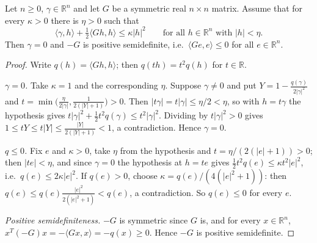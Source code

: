 \begin{lemma}
Let $n\ge0$, $\gamma\in\mathbb R^n$ and let $G$ be a symmetric real $n\times n$ matrix. Assume that for every $\kappa>0$ there is $\eta>0$ such that
\[
\langle\gamma,h\rangle+\tfrac12\langle Gh,h\rangle\le\kappa|h|^2\qquad\text{for all }h\in\mathbb R^n\text{ with }|h|<\eta .
\]
Then $\gamma=0$ and $-G$ is positive semidefinite, i.e.\ $\langle Ge,e\rangle\le0$ for all $e\in\mathbb R^n$.
\end{lemma}
\begin{proof}
Write $q(h)=\langle Gh,h\rangle$; then $q(th)=t^2q(h)$ for $t\in\mathbb R$.

\emph{$\gamma=0$.} Take $\kappa=1$ and the corresponding $\eta$. Suppose $\gamma\ne0$ and put $Y=1-\frac{q(\gamma)}{2|\gamma|^2}$ and $t=\min\bigl(\frac{\eta}{2|\gamma|},\frac1{2(|Y|+1)}\bigr)>0$. Then $|t\gamma|=t|\gamma|\le\eta/2<\eta$, so with $h=t\gamma$ the hypothesis gives $t|\gamma|^2+\frac12t^2q(\gamma)\le t^2|\gamma|^2$. Dividing by $t|\gamma|^2>0$ gives $1\le tY\le t|Y|\le\frac{|Y|}{2(|Y|+1)}<1$, a contradiction. Hence $\gamma=0$.

\emph{$q\le0$.} Fix $e$ and $\kappa>0$, take $\eta$ from the hypothesis and $t=\eta/(2(|e|+1))>0$; then $|te|<\eta$, and since $\gamma=0$ the hypothesis at $h=te$ gives $\frac12t^2q(e)\le\kappa t^2|e|^2$, i.e.\ $q(e)\le2\kappa|e|^2$. If $q(e)>0$, choose $\kappa=q(e)/(4(|e|^2+1))$: then $q(e)\le q(e)\frac{|e|^2}{2(|e|^2+1)}<q(e)$, a contradiction. So $q(e)\le0$ for every $e$.

\emph{Positive semidefiniteness.} $-G$ is symmetric since $G$ is, and for every $x\in\mathbb R^n$, $x^T(-G)x=-\langle Gx,x\rangle=-q(x)\ge0$. Hence $-G$ is positive semidefinite.
\end{proof}
